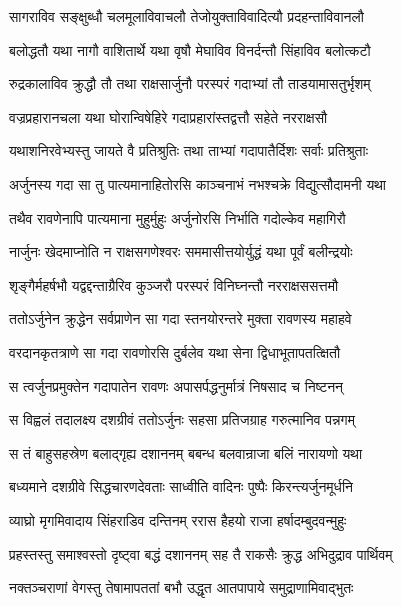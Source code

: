 \twolineshloka
{सागराविव सङ्क्षुब्धौ चलमूलाविवाचलौ}
{तेजोयुक्ताविवादित्यौ प्रदहन्ताविवानलौ} %

\twolineshloka
{बलोद्धतौ यथा नागौ वाशितार्थे यथा वृषौ}
{मेघाविव विनर्दन्तौ सिंहाविव बलोत्कटौ} %

\twolineshloka
{रुद्रकालाविव क्रुद्धौ तौ तथा राक्षसार्जुनौ}
{परस्परं गदाभ्यां तौ ताडयामासतुर्भृशम्} %

\twolineshloka
{वज्रप्रहारानचला यथा घोरान्विषेहिरे}
{गदाप्रहारांस्तद्वत्तौ सहेते नरराक्षसौ} %

\twolineshloka
{यथाशनिरवेभ्यस्तु जायते वै प्रतिश्रुतिः}
{तथा ताभ्यां गदापातैर्दिशः सर्वाः प्रतिश्रुताः} %

\twolineshloka
{अर्जुनस्य गदा सा तु पात्यमानाहितोरसि}
{काञ्चनाभं नभश्चक्रे विद्युत्सौदामनी यथा} %

\twolineshloka
{तथैव रावणेनापि पात्यमाना मुहुर्मुहुः}
{अर्जुनोरसि निर्भाति गदोल्केव महागिरौ} %

\twolineshloka
{नार्जुनः खेदमाप्नोति न राक्षसगणेश्वरः}
{सममासीत्तयोर्युद्धं यथा पूर्वं बलीन्द्रयोः} %

\twolineshloka
{शृङ्गैर्महर्षभौ यद्वद्दन्ताग्रैरिव कुञ्जरौ}
{परस्परं विनिघ्नन्तौ नरराक्षससत्तमौ} %

\twolineshloka
{ततोऽर्जुनेन क्रुद्धेन सर्वप्राणेन सा गदा}
{स्तनयोरन्तरे मुक्ता रावणस्य महाहवे} %

\twolineshloka
{वरदानकृतत्राणे सा गदा रावणोरसि}
{दुर्बलेव यथा सेना द्विधाभूतापतत्क्षितौ} %

\twolineshloka
{स त्वर्जुनप्रमुक्तेन गदापातेन रावणः}
{अपासर्पद्धनुर्मात्रं निषसाद च निष्टनन्} %

\twolineshloka
{स विह्वलं तदालक्ष्य दशग्रीवं ततोऽर्जुनः}
{सहसा प्रतिजग्राह गरुत्मानिव पन्नगम्} %

\twolineshloka
{स तं बाहुसहस्रेण बलाद्गृह्य दशाननम्}
{बबन्ध बलवान्राजा बलिं नारायणो यथा} %

\twolineshloka
{बध्यमाने दशग्रीवे सिद्धचारणदेवताः}
{साध्वीति वादिनः पुष्पैः किरन्त्यर्जुनमूर्धनि} %

\twolineshloka
{व्याघ्रो मृगमिवादाय सिंहराडिव दन्तिनम्}
{ररास हैहयो राजा हर्षादम्बुदवन्मुहुः} %

\twolineshloka
{प्रहस्तस्तु समाश्वस्तो दृष्ट्वा बद्धं दशाननम्}
{सह तै राकसैः क्रुद्ध अभिदुद्राव पार्थिवम्} %

\twolineshloka
{नक्तञ्चराणां वेगस्तु तेषामापततां बभौ}
{उद्धृत आतपापाये समुद्राणामिवाद्भुतः} %

